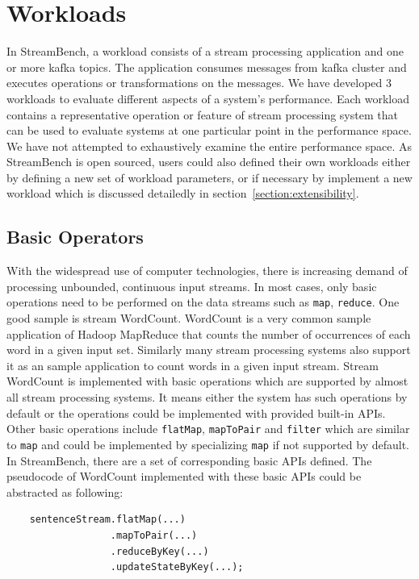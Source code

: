 \section{Workloads}
\label{section:workloads}

In StreamBench, a workload consists of a stream processing application and one or more kafka topics. The application consumes messages from kafka cluster and executes operations or transformations on the messages. We have developed 3 workloads to evaluate different aspects of a system's performance. Each workload contains a representative operation or feature of stream processing system that can be used to evaluate systems at one particular point in the performance space. We have not attempted to exhaustively examine the entire performance space. As StreamBench is open sourced, users could also defined their own workloads either by defining a new set of workload parameters, or if necessary by implement a new workload which is discussed detailedly in section~\ref{section:extensibility}.


\subsection{Basic Operators}

With the widespread use of computer technologies, there is increasing demand of processing unbounded, continuous input streams. In most cases, only basic operations need to be performed on the data streams such as \texttt{map}, \texttt{reduce}. One good sample is stream WordCount. WordCount is a very common sample application of Hadoop MapReduce that counts the number of occurrences of each word in a given input set. \cite{MapReduce} Similarly many stream processing systems also support it as an sample application to count words in a  given input stream. Stream WordCount is implemented with basic operations which are supported by almost all stream processing systems. It means either the system has such operations by default or the operations could be implemented with provided built-in APIs. Other basic operations include \texttt{flatMap}, \texttt{mapToPair} and \texttt{filter} which are similar to \texttt{map} and could be implemented by specializing \texttt{map} if not supported by default. In StreamBench, there are a set of corresponding basic APIs defined. The pseudocode of WordCount implemented with these basic APIs could be abstracted as following:

\begin{lstlisting}
    sentenceStream.flatMap(...)
                  .mapToPair(...)
                  .reduceByKey(...)
                  .updateStateByKey(...);

\end{lstlisting}

